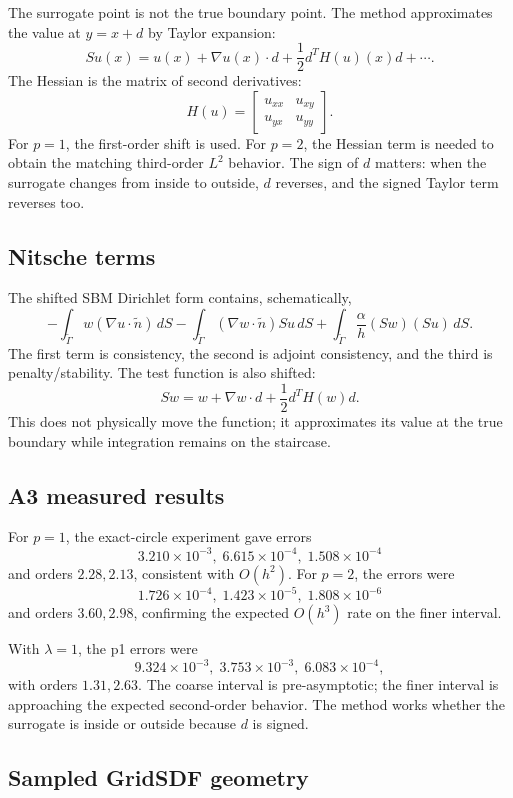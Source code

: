 \documentclass[11pt]{article}
\begin{document}
The surrogate point is not the true boundary point. The method approximates
the value at $y=x+d$ by Taylor expansion:
\[
 Su(x)=u(x)+\nabla u(x)\cdot d
 +\frac12d^T H(u)(x)d+\cdots.
\]
The Hessian is the matrix of second derivatives:
\[
 H(u)=
 \begin{bmatrix}u_{xx}&u_{xy}\\u_{yx}&u_{yy}\end{bmatrix}.
\]
For $p=1$, the first-order shift is used. For $p=2$, the Hessian term is
needed to obtain the matching third-order $L^2$ behavior. The sign of $d$
matters: when the surrogate changes from inside to outside, $d$ reverses,
and the signed Taylor term reverses too.

\subsection{Nitsche terms}

The shifted SBM Dirichlet form contains, schematically,
\[
 -\int_{\widetilde\Gamma} w(\nabla u\cdot\widetilde n)\,dS
 -\int_{\widetilde\Gamma}(\nabla w\cdot\widetilde n)Su\,dS
 +\int_{\widetilde\Gamma}\frac{\alpha}{h}(Sw)(Su)\,dS.
\]
The first term is consistency, the second is adjoint consistency, and the
third is penalty/stability. The test function is also shifted:
\[
 Sw=w+\nabla w\cdot d+\frac12d^TH(w)d.
\]
This does not physically move the function; it approximates its value at the
true boundary while integration remains on the staircase.

\subsection{A3 measured results}

For $p=1$, the exact-circle experiment gave errors
\[
3.210\times10^{-3},\;6.615\times10^{-4},\;1.508\times10^{-4}
\]
and orders $2.28,2.13$, consistent with $O(h^2)$. For $p=2$, the errors were
\[
1.726\times10^{-4},\;1.423\times10^{-5},\;1.808\times10^{-6}
\]
and orders $3.60,2.98$, confirming the expected $O(h^3)$ rate on the finer
interval.

With $\lambda=1$, the p1 errors were
\[
9.324\times10^{-3},\;3.753\times10^{-3},\;6.083\times10^{-4},
\]
with orders $1.31,2.63$. The coarse interval is pre-asymptotic; the finer
interval is approaching the expected second-order behavior. The method works
whether the surrogate is inside or outside because $d$ is signed.

\subsection{Sampled GridSDF geometry}
\end{document}
